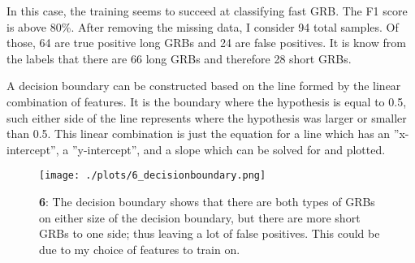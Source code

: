 In this case, the training seems to succeed at classifying fast GRB. The F1 score is above 80\%. After removing the missing data, I consider 94 total samples. Of those, 64 are true positive long GRBs and 24 are false positives. It is know from the labels that there are 66 long GRBs and therefore 28 short GRBs.

A decision boundary can be constructed based on the line formed by the linear combination of features. It is the boundary where the hypothesis is equal to 0.5, such either side of the line represents where the hypothesis was larger or smaller than 0.5. This linear combination is just the equation for a line which has an ''x-intercept'', a ''y-intercept'', and a slope which can be solved for and plotted.

\begin{figure}[h!]
  \centering
  \texttt{[image: ./plots/6\_decisionboundary.png]}
  \caption{\textbf{6}: The decision boundary shows that there are both types of GRBs on either size of the decision boundary, but there are more short GRBs to one side; thus leaving a lot of false positives. This could be due to my choice of features to train on.}
  \label{fig:decisionboundary}
\end{figure}